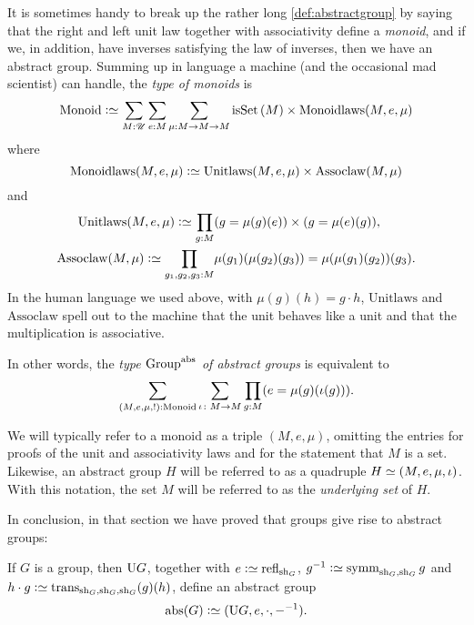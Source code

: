 \begin{remark}
  It is sometimes handy to break up the rather long
  \cref{def:abstractgroup} by saying that the right and left unit law
  together with associativity define a \emph{monoid}, and if we, in
  addition, have inverses satisfying the law of inverses, then we have
  an abstract group.%
  \label{rem:typemonoidabstrgp}
  Summing up in language a machine (and the occasional mad scientist)
  can handle, the \emph{type of monoids} is
  $$\typemonoid\defequi \sum_{M:\UU}\sum_{e:M}\sum_{\mu{}:M\to M\to M}
  \isset{(M)}\times\mathrm{Monoidlaws}(M,e,\mu)
  $$
  where
  $$\mathrm{Monoidlaws}(M,e,\mu)\defequi\mathrm{Unitlaws}(M,e,\mu)\times\mathrm{Assoclaw}(M,\mu{})$$
  and
  \begin{align*}
    \mathrm{Unitlaws}(M,e,\mu)\defequi\prod_{g:M}
    & (g=\mu{}(g)(e))\times(g=\mu{}(e)(g)),
    \\
    \mathrm{Assoclaw}(M,\mu{})\defequi\prod_{g_1,g_2,g_3:M}
    & \mu{}(g_1)(\mu{}(g_2)(g_3))=\mu{}(\mu{}(g_1)(g_2))(g_3).
  \end{align*}
  In the human language we used above, with $\mu(g)(h)=g\cdot h$,
  $\mathrm{Unitlaws}$ and $\mathrm{Assoclaw}$ spell out to the machine
  that the unit behaves like a unit and that the multiplication is
  associative.

  In other words, the \emph{type $\mathrm{Group}^{\mathrm{abs}}$ of abstract
    groups} is equivalent to
  \begin{displaymath}
    \sum_{(M,e,\mu,!):\mathrm{Monoid}} \sum_{\iota\colon M\to M} \prod_{g:M}(e=\mu(g)(\iota(g))).
  \end{displaymath}

  We will typically refer to a monoid as a triple $(M,e,\mu)$,
  omitting the entries for proofs of the unit and
  associativity laws and for the statement that $M$ is a set.
  Likewise, an abstract group $H$ will be referred
  to as a quadruple $H \jdeq (M,e,\mu,\iota)$.  With this notation, the set
  $M$ will be referred to as the \emph{underlying set} of $H$.
\end{remark}

In conclusion, in that section we have proved that groups give rise to
abstract groups:

\begin{lemma}\label{lem:idtypesgiveabstractgroups}
  If $G$ is a group, then $\mathrm{U} G$,
  together with $e\defequi\refl{\shape_G}{}$,
  $g^{-1}\defequi\symm_{\shape_G,\shape_G}g$
  and $h \cdot g \defequi \trans_{\shape_G,\shape_G,\shape_G}(g)(h)$, define an abstract group
  $$\abstr(G)\defequi (\USym G,e,\cdot,{-}^{-1}).$$
\end{lemma}

